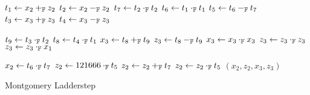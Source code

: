 
\begin{algorithm}[h]
\label{evaluation:ladder-step:montgomery}
\begin{algorithmic}[1]
\begin{multicols}{3}
\State $t_1 \leftarrow x_2 +_{\mathbb{F}} z_2$
\State $t_2 \leftarrow x_2 -_{\mathbb{F}} z_2$
\State $t_7 \leftarrow t_2 \cdot_{\mathbb{F}} t_2$
\State $t_6 \leftarrow t_1 \cdot_{\mathbb{F}} t_1$
\State $t_5 \leftarrow t_6 -_{\mathbb{F}} t_7$
\State $t_3 \leftarrow x_3 +_{\mathbb{F}} z_3$
\State $t_4 \leftarrow x_3 -_{\mathbb{F}} z_3$\rule{0ex}{0ex}
\State $t_9 \leftarrow t_3 \cdot_{\mathbb{F}} t_2$
\State $t_8 \leftarrow t_4 \cdot_{\mathbb{F}} t_1$
\State $x_3 \leftarrow t_8 +_{\mathbb{F}} t_9$
\State $z_3 \leftarrow t_8 -_{\mathbb{F}} t_9$
\State $x_3 \leftarrow x_3 \cdot_{\mathbb{F}} x_3$
\State $z_3 \leftarrow z_3 \cdot_{\mathbb{F}} z_3$
\State $z_3 \leftarrow z_3 \cdot_{\mathbb{F}} x_1$\rule{0ex}{0ex} 
\State $x_2 \leftarrow t_6 \cdot_{\mathbb{F}} t_7$
\State $z_2 \leftarrow  121666 \cdot_{\mathbb{F}} t_5$
\State $z_2 \leftarrow z_2 +_{\mathbb{F}} t_7$
\State $z_2 \leftarrow z_2 \cdot_{\mathbb{F}} t_5$
\State \Return $(x_2, z_2, x_3, z_3)$
\EndFunction
\end{multicols}
\end{algorithmic}
\caption{Montgomery Ladderstep}
\end{algorithm}

 
